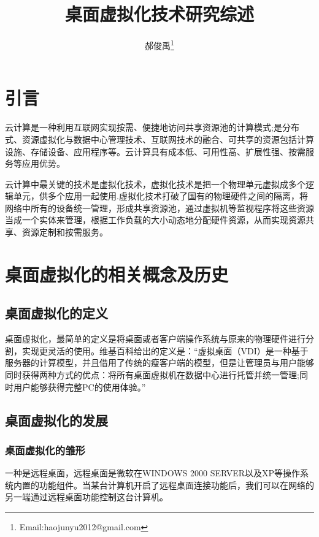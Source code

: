 \documentclass[10pt,a4paper]{article}
\begin{document}
\begin{CJK*}{UTF8}{gkai}
\pagestyle{fancy} 
\lhead{}
\rhead{}
\title{桌面虚拟化技术研究综述}					   					%
\author{郝俊禹\thanks{Email:haojunyu2012@gmail.com}}				%
\date{}                                             				%
\maketitle                                          				%
\tableofcontents 												%
\clearpage


\section{引言}
云计算是一种利用互联网实现按需、便捷地访问共享资源池的计算模式;是分布式、资源虚拟化与数据中心管理技术、互联网技术的融合、可共享的资源包括计算设施、存储设备、应用程序等\cite{1}。云计算具有成本低、可用性高、扩展性强、按需服务等应用优势。


云计算中最关键的技术是虚拟化技术，虚拟化技术是把一个物理单元虚拟成多个逻辑单元，供多个应用一起使用\cite{2}.虚拟化技术打破了国有的物理硬件之间的隔离，将网络中所有的设备统一管理，形成共享资源池，通过虚拟机等监视程序将这些资源当成一个实体来管理，根据工作负载的大小动态地分配硬件资源，从而实现资源共享、资源定制和按需服务。


\section{桌面虚拟化的相关概念及历史}
\subsection{桌面虚拟化的定义}
桌面虚拟化，最简单的定义是将桌面或者客户端操作系统与原来的物理硬件进行分割，实现更灵活的使用\cite{3}。维基百科给出的定义是：“虚拟桌面（VDI）是一种基于服务器的计算模型，并且借用了传统的瘦客户端的模型，但是让管理员与用户能够同时获得两种方式的优点：将所有桌面虚拟机在数据中心进行托管并统一管理;同时用户能够获得完整PC的使用体验。”


\subsection{桌面虚拟化的发展}
\subsubsection{桌面虚拟化的雏形}
一种是远程桌面，远程桌面是微软在WINDOWS 2000 SERVER以及XP等操作系统内置的功能组件。当某台计算机开启了远程桌面连接功能后，我们可以在网络的另一端通过远程桌面功能控制这台计算机。



\end{CJK*}
\end{document}
